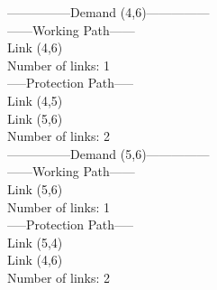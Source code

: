 ---------------Demand (4,6)--------------- \\

------Working Path------ \\
Link  (4,6) \\
Number of links: 1 \\

-----Protection Path----- \\
Link  (4,5) \\
Link  (5,6) \\
Number of links: 2 \\


---------------Demand (5,6)--------------- \\

------Working Path------ \\
Link  (5,6) \\
Number of links: 1 \\

-----Protection Path----- \\
Link  (5,4) \\
Link  (4,6) \\
Number of links: 2 \\
